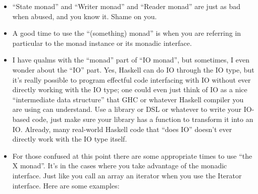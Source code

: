 \documentclass[]{article}
\begin{document}
\begin{itemize}
\item
  ``State monad'' and ``Writer monad'' and ``Reader monad'' are just as bad when
  abused, and you know it. Shame on you.
\item
  A good time to use the ``(something) monad'' is when you are referring in
  particular to the monad instance or its monadic interface.
\item
  I have qualms with the ``monad'' part of ``IO monad'', but sometimes, I even
  wonder about the ``IO'' part. Yes, Haskell can do IO through the IO type, but
  it's really possible to program effectful code interfacing with IO without
  ever directly working with the IO type; one could even just think of IO as a
  nice ``intermediate data structure'' that GHC or whatever Haskell compiler you
  are using can understand. Use a library or DSL or whatever to write your
  IO-based code, just make sure your library has a function to transform it into
  an IO. Already, many real-world Haskell code that ``does IO'' doesn't ever
  directly work with the IO type itself.
\item
  For those confused at this point there are some appropriate times to use ``the
  X monad''. It's in the cases where you take advantage of the monadic
  interface. Just like you call an array an iterator when you use the Iterator
  interface. Here are some examples:


\end{itemize}
\end{document}
